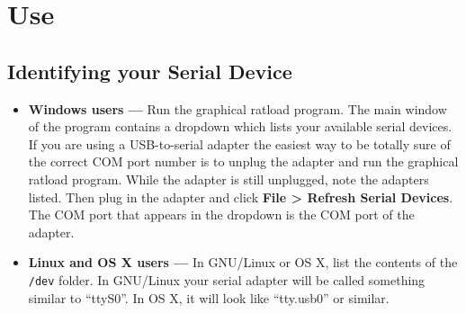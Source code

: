 \documentclass[notitlepage]{article}
\begin{document}
\section{Use}
\subsection{Identifying your Serial Device}
\label{sec:serial_id}
\begin{itemize}
\item \textbf{Windows users --- } Run the graphical ratload program. The main window of the program contains a dropdown which lists your available serial devices. If you are using a USB-to-serial adapter the easiest way to be totally sure of the correct COM port number is to unplug the adapter and run the graphical ratload program. While the adapter is still unplugged, note the adapters listed. Then plug in the adapter and click \textbf{File > Refresh Serial Devices}. The COM port that appears in the dropdown is the COM port of the adapter.

\item \textbf{Linux and OS X users --- } In GNU/Linux or OS X, list the contents of the \texttt{/dev} folder. In GNU/Linux your serial adapter will be called something similar to ``ttyS0''. In OS X, it will look like ``tty.usb0'' or similar.
\end{itemize}
\end{document}
